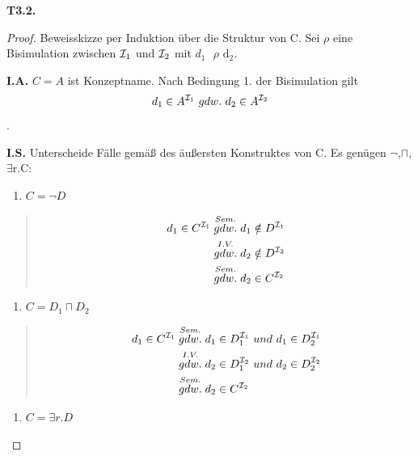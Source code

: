 \textbf{T3.2.}

\begin{proof}
Beweisskizze per Induktion über die Struktur von C. Sei $\rho$ eine
Bisimulation zwischen $\mathcal{I}_{1}$ und $\mathcal{I}_{2}$ mit
$d_{1}\text{\ $\rho$}\text{\ d}_{2}$.

\textbf{I.A.} $C = A$ ist Konzeptname. Nach Bedingung 1. der
Bisimulation gilt $$d_{1} \in A^{\mathcal{I}_{1}}\ gdw.\ d_{2} \in A^{\mathcal{I}_{2}}$$.

\textbf{I.S.} Unterscheide Fälle gemäß des äußersten Konstruktes von C.
Es genügen $\neg$,$\sqcap$, $\exists\text{r.C}$:

\begin{enumerate}
\def\labelenumi{\arabic{enumi}.}
\item
  $C = \neg D$
\end{enumerate}

\begin{quote}
\begin{equation}
\begin{split}
d_{1} \in C^{\mathcal{I}_{1}} &\stackrel{Sem.}{gdw.} d_{1} \notin D^{\mathcal{I}_{1}}\\
&\stackrel{I.V.}{gdw.} d_{2} \notin D^{\mathcal{I}_{2}} \\
&\stackrel{Sem.}{gdw.} d_{2} \in C^{\mathcal{I}_{2}}
\end{split}
\end{equation}
\end{quote}

\begin{enumerate}
\def\labelenumi{\arabic{enumi}.}
\item
  $C = D_{1} \sqcap D_{2}$
\end{enumerate}

\begin{quote}
\begin{equation}
\begin{split}
d_{1} \in C^{\mathcal{I}_{1}} &\stackrel{Sem.}{gdw.} d_{1} \in D_{1}^{\mathcal{I}_{1}}\ und\ d_{1} \in D_{2}^{\mathcal{I}_{1}}\\
&\stackrel{I.V.}{gdw.} d_{2} \in D_{1}^{\mathcal{I}_{2}}\ und\ d_{2} \in D_{2}^{\mathcal{I}_{2}} \\
&\stackrel{Sem.}{gdw.} d_{2} \in C^{\mathcal{I}_{2}}
\end{split}
\end{equation}
\end{quote}

\begin{enumerate}
\def\labelenumi{\arabic{enumi}.}
\item
  $C = \exists r.D$
\end{enumerate}


\end{proof}
